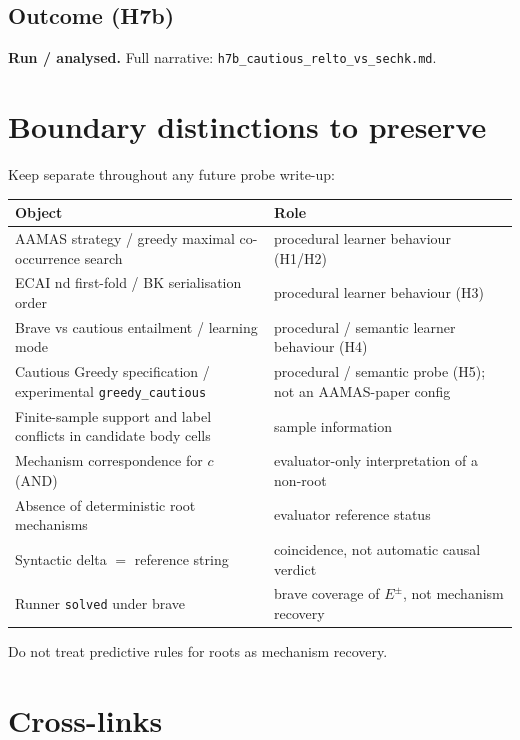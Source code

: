 \documentclass[11pt]{article}
\begin{document}
\subsection{Outcome (H7b)}
\textbf{Run / analysed.} Full narrative: \texttt{h7b\_cautious\_relto\_vs\_sechk.md}.

\section{Boundary distinctions to preserve}

Keep separate throughout any future probe write-up:

\begin{center}
\begin{tabular}{@{}L{0.42\textwidth}L{0.48\textwidth}@{}}
\toprule
Object & Role \\
\midrule
AAMAS strategy / greedy maximal co-occurrence search &
  procedural learner behaviour (H1/H2) \\
ECAI nd first-fold / BK serialisation order &
  procedural learner behaviour (H3) \\
Brave vs cautious entailment / learning mode &
  procedural / semantic learner behaviour (H4) \\
Cautious Greedy specification / experimental \texttt{greedy\_cautious} &
  procedural / semantic probe (H5); not an AAMAS-paper config \\
Finite-sample support and label conflicts in candidate body cells &
  sample information \\
Mechanism correspondence for \(c\) (AND) &
  evaluator-only interpretation of a non-root \\
Absence of deterministic root mechanisms &
  evaluator reference status \\
Syntactic delta $=$ reference string &
  coincidence, not automatic causal verdict \\
Runner \texttt{solved} under brave &
  brave coverage of \(E^\pm\), not mechanism recovery \\
\bottomrule
\end{tabular}
\end{center}

Do not treat predictive rules for roots as mechanism recovery.

\section{Cross-links}
\end{document}

